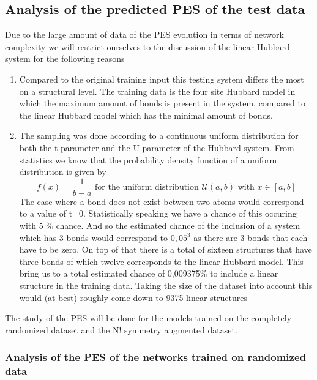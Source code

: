 \documentclass[12pt]{article}
\begin{document}
\subsection{Analysis of the predicted PES of the test data}
Due to the large amount of data of the PES evolution in terms of network complexity we will restrict ourselves to the discussion of the linear Hubbard system for the following reasons
\begin{enumerate}
	\item Compared to the original training input this testing system differs the most on a structural level. The training data is the four site Hubbard model in which the maximum amount of bonds is present in the system, compared to the linear Hubbard model which has the minimal amount of bonds.
	\item The sampling was done according to a continuous uniform distribution for both the t parameter and the U parameter of the Hubbard system. From statistics we know that the probability density function of a uniform distribution is given by
	\begin{equation*}
	f(x) = \frac{1}{b-a} \text{ for the uniform distribution } \mathcal{U}(a,b) \text{ with } x \in \left[ a, b \right]
	\end{equation*}
	The case where a bond does not exist between two atoms would correspond to a value of t=0. Statistically speaking we have a chance of this occuring with 5 $\%$ chance. And so the estimated chance of the inclusion of a system which has 3 bonds would correspond to $0,05^3$ as there are 3 bonds that each have to be zero. On top of that there is a total of sixteen structures that have three bonds of which twelve corresponds to the linear Hubbard model. This bring us to a total estimated chance of 0,009375$\%$ to include a linear structure in the training data. Taking the size of the dataset into account this would (at best) roughly come down to 9375 linear structures
\end{enumerate}
The study of the PES will be done for the models trained on the completely randomized dataset and the N! symmetry augmented dataset.

\subsubsection{Analysis of the PES of the networks trained on randomized data}
\end{document}
